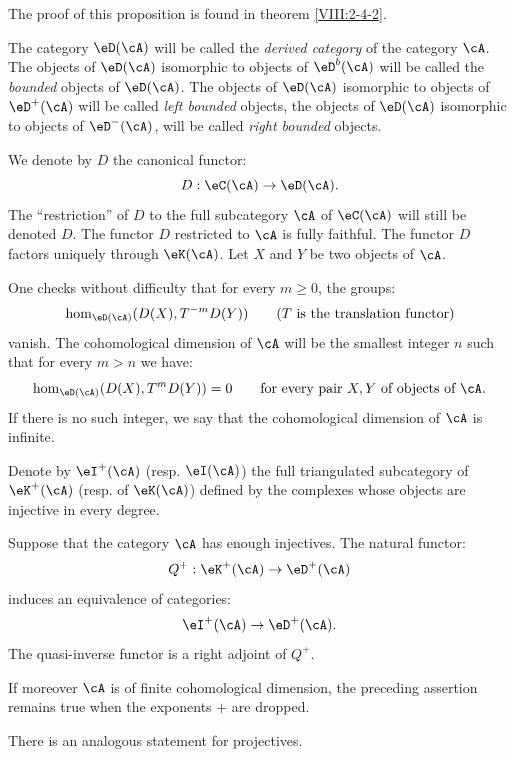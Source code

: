 The proof of this proposition is found in theorem \ref{VIII:2-4-2}. 





\begin{definition}\label{VIII:3-1-3}
The category $\eD(\cA)$ will be called the \emph{derived category} of the
category $\cA$. The objects of $\eD(\cA)$ isomorphic to objects of $\eD^b(\cA)$
will be called the \emph{bounded} objects of $\eD(\cA)$. The objects of
$\eD(\cA)$ isomorphic to objects of $\eD^+(\cA)$ will be called
\emph{left bounded} objects, the objects of $\eD(\cA)$ isomorphic to objects of
$\eD^-(\cA)$, will be called \emph{right bounded} objects.
\end{definition}

We denote by $D$ the canonical functor:
\[
  D : \eC(\cA) \to \eD(\cA) \text{.}
\]
The ``restriction'' of $D$ to the full subcategory $\cA$ of $\eC(\cA)$
will still be denoted $D$. The functor $D$ restricted to $\cA$ is fully
faithful. The functor $D$ factors uniquely through $\eK(\cA)$.
Let $X$ and $Y$ be two objects of $\cA$.

One checks without difficulty that for every $m\geqslant 0$, the groups:
\[
  \hom_{\eD(\cA)}(D(X),T^{-m} D(Y)) \qquad \text{($T$ is the translation functor)}
\]
vanish. The cohomological dimension of $\cA$ will be the smallest integer
$n$ such that for every $m>n$ we have:
\[
  \hom_{\eD(\cA)}(D(X),T^m D(Y)) = 0 \qquad\text{for every pair $X,Y$ of objects of $\cA$.}
\]
If there is no such integer, we say that the cohomological dimension of $\cA$
is infinite.

Denote by $\eI^+(\cA)$ (resp. $\eI(\cA)$) the full triangulated subcategory
of $\eK^+(\cA)$ (resp. of $\eK(\cA)$) defined by the complexes whose
objects are injective in every degree. 





\begin{proposition}\label{VIII:3-1-4}
Suppose that the category $\cA$ has enough injectives. The
natural functor:
\[
  Q^+:\eK^+(\cA) \to \eD^+(\cA)
\]
induces an equivalence of categories:
\[
  \eI^+(\cA) \to \eD^+(\cA)  \text{.}
\]
The quasi-inverse functor is a right adjoint of $Q^+$.
\end{proposition}

If moreover $\cA$ is of finite cohomological dimension, the preceding
assertion remains true when the exponents $+$ are dropped.

There is an analogous statement for projectives.

